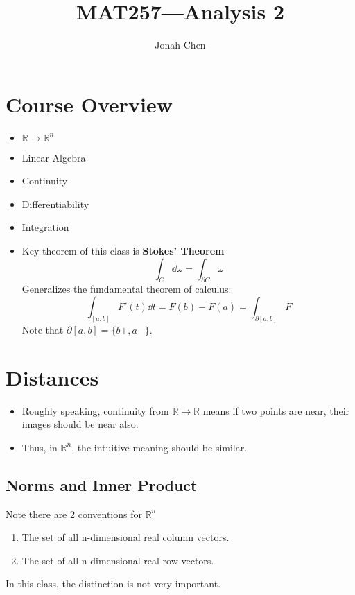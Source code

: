\documentclass[a4paper]{article}
\title{MAT257---Analysis 2}
\author{Jonah Chen}
\numberwithin{equation}{section}
\begin{document}
\sffamily
\maketitle
\tableofcontents
\section{Course Overview}
\begin{itemize}
    \item $\mathbb R\to\mathbb R^n$
    \item Linear Algebra
    \item Continuity
    \item Differentiability
    \item Integration
    \item Key theorem of this class is \textbf{Stokes' Theorem}
    \begin{equation}
        \int_C\dd\omega=\int_{\partial C}\omega
    \end{equation}
    Generalizes the fundamental theorem of calculus:
    \begin{equation}
        \int_{[a,b]}F'(t)\dd t=F(b)-F(a)=\int_{\partial[a,b]}F
    \end{equation}
    Note that $\partial[a,b]=\{b+, a-\}$.
\end{itemize}

\section{Distances}
\begin{itemize}
    \item Roughly speaking, continuity from $\mathbb R\to\mathbb R$ means if two points are near, their images should be near also.
    \item Thus, in $\mathbb R^n$, the intuitive meaning should be similar.
\end{itemize}
\subsection{Norms and Inner Product}
Note there are 2 conventions for $\mathbb R^n$
\begin{enumerate}
    \item The set of all n-dimensional real column vectors.
    \item The set of all n-dimensional real row vectors.
\end{enumerate}
In this class, the distinction is not very important.
\end{document}
